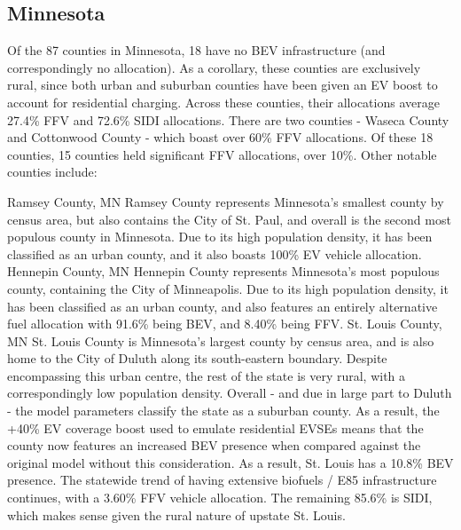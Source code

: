 \documentclass[answers]{exam}
\begin{document}
\subsection{Minnesota}
Of the 87 counties in Minnesota, 18 have no BEV infrastructure (and correspondingly no allocation). As a corollary, these counties are exclusively rural, since both urban and suburban counties have been given an EV boost to account for residential charging. Across these counties, their allocations average 27.4\% FFV and 72.6\% SIDI allocations. There are two counties - Waseca County and Cottonwood County - which boast over 60\% FFV allocations. Of these 18 counties, 15 counties held significant FFV allocations, over 10\%. Other notable counties include:
\begin{outline}
\1 Ramsey County, MN
\2 Ramsey County represents Minnesota's smallest county by census area, but also contains the City of St. Paul, and overall is the second most populous county in Minnesota. Due to its high population density, it has been classified as an urban county, and it also boasts 100\% EV vehicle allocation. 
\1 Hennepin County, MN
\2 Hennepin County represents Minnesota's most populous county, containing the City of Minneapolis. Due to its high population density, it has been classified as an urban county, and also features an entirely alternative fuel allocation with 91.6\% being BEV, and 8.40\% being FFV. 
\1 St. Louis County, MN
\2 St. Louis County is Minnesota's largest county by census area, and is also home to the City of Duluth along its south-eastern boundary. Despite encompassing this urban centre, the rest of the state is very rural, with a correspondingly low population density. Overall - and due in large part to Duluth - the model parameters classify the state as a suburban county. As a result, the +40\% EV coverage boost used to emulate residential EVSEs means that the county now features an increased BEV presence when compared against the original model without this consideration. As a result, St. Louis has a 10.8\% BEV presence. The statewide trend of having extensive biofuels / E85 infrastructure continues, with a 3.60\% FFV vehicle allocation. The remaining 85.6\% is SIDI, which makes sense given the rural nature of upstate St. Louis.
\end{outline}
\end{document}
